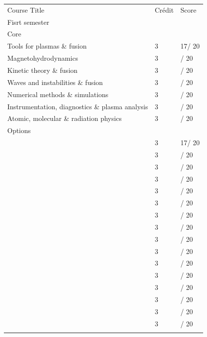 \documentclass[a4paper, 11pt]{letter}
\def\OptA{Magnetic fusion: turbulence, transport, heating \& confinement}
\def\OptB{Physics \& diagnostics in tokamaks}
\def\OptC{Space plasmas}
\def\OptD{High energu density astrophysical plasmas}
\def\OptE{Low pressure cold plasmas}
\def\OptF{Non-equilibrium plasmas at high pressure}
\def\OptG{Relativistic laser-plasma interaction}
\def\OptH{Laser-plasma interaction and confinement inertial fusion}
\def\SpeA{Diffuse astrophysical plasmas}
\def\SpeB{Numerical simulations \& solar magnetism}
\def\SpeC{Hydrodynamics of inertial fusion}
\def\SpeD{Power \& high energy lasers}
\def\SpeE{Advanced physics for Tokamaks}
\def\SpeF{Tokamaks : experimentation}
\def\SpeG{Plasmas for energy and aerospace applications}
\def\SpeH{Plasmas for materials, environment, biomedicine \& agriculture}
\def\Ca{17}
\def\Cb{}
\def\Cc{}
\def\Cd{}
\def\Ce{}
\def\Cf{}
\def\Cg{}
\def\Oa{17}
\def\Ob{}
\def\Oc{}
\def\Od{}
\def\Oe{}
\def\Of{}
\def\Og{}
\def\Oh{}
\def\Sa{}
\def\Sb{}
\def\Sc{}
\def\Sd{}
\def\Se{}
\def\Sf{}
\def\Sg{}
\def\Sh{}
\begin{document}
\begin{tabular}{p{}p{}p{}}
Course Title & Crédit & Score \\
Fisrt semester & & \\
\rowcolor{lGray}
Core & & \\
Tools for plasmas \& fusion                     & 3 & \Ca / 20 \\
Magnetohydrodynamics                            & 3 & \Cb / 20 \\
Kinetic theory \& fusion                        & 3 & \Cc / 20 \\
\arrayrulecolor{dGray}\hline
Waves and instabilities \& fusion               & 3 & \Cd / 20 \\
Numerical methods \& simulations                & 3 & \Ce / 20 \\
Instrumentation, diagnostics \& plasma analysis & 3 & \Cf / 20 \\
Atomic, molecular \& radiation physics          & 3 & \Cg / 20 \\
\arrayrulecolor{dGray}\hline
\rowcolor{lGray}
Options & & \\
\ifdefempty{\Oa}{}{\OptA                        & 3 & \Oa / 20 \\}
\ifdefempty{\Ob}{}{\OptB                        & 3 & \Ob / 20 \\}
\ifdefempty{\Oc}{}{\OptC                        & 3 & \Oc / 20 \\}
\ifdefempty{\Od}{}{\OptD                        & 3 & \Od / 20 \\}
\ifdefempty{\Oe}{}{\OptE                        & 3 & \Oe / 20 \\}
\ifdefempty{\Of}{}{\OptF                        & 3 & \Of / 20 \\}
\ifdefempty{\Og}{}{\OptG                        & 3 & \Og / 20 \\}
\ifdefempty{\Oh}{}{\OptH                        & 3 & \Oh / 20 \\}

\ifdefempty{\Sa}{}{\SpeA                        & 3 & \Sa / 20 \\}
\ifdefempty{\Sb}{}{\SpeB                        & 3 & \Sb / 20 \\}
\ifdefempty{\Sc}{}{\SpeC                        & 3 & \Sc / 20 \\}
\ifdefempty{\Sd}{}{\SpeD                        & 3 & \Sd / 20 \\}
\ifdefempty{\Se}{}{\SpeE                        & 3 & \Se / 20 \\}
\ifdefempty{\Sf}{}{\SpeF                        & 3 & \Sf / 20 \\}
\ifdefempty{\Sg}{}{\SpeG                        & 3 & \Sg / 20 \\}
\ifdefempty{\Sh}{}{\SpeH                        & 3 & \Sh / 20 \\}

\end{tabular}
\end{document}
